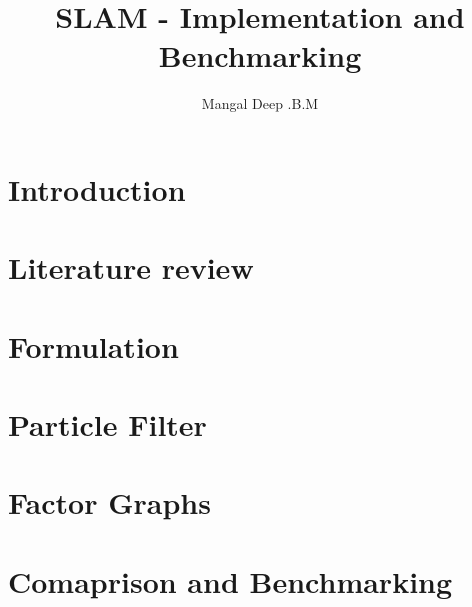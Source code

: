 \documentclass{lincolncsuthesis}
\title{SLAM - Implementation and Benchmarking}
\author{Mangal Deep .B.M}
\begin{document}
\maketitle{}








\thesisTables

\thesisBodyStart

\chapter{Introduction}


\chapter{Literature review}


\chapter{Formulation}


\chapter{Particle Filter}


\chapter{Factor  Graphs}


\chapter{Comaprison and Benchmarking}


\end{document}
